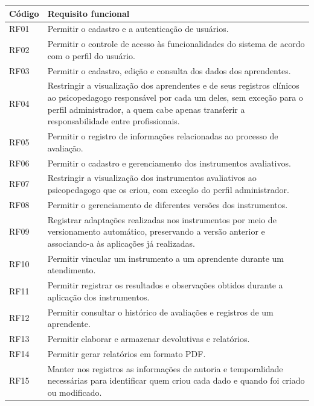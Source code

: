 \begin{quadro}[H]
\centering
\small
\caption{Requisitos funcionais}
\begin{tabular}{p{2cm} p{13cm}}
\hline
\textbf{Código} & \textbf{Requisito funcional} \\
\hline
RF01 & Permitir o cadastro e a autenticação de usuários. \\
RF02 & Permitir o controle de acesso às funcionalidades do sistema de acordo com o perfil do usuário. \\
RF03 & Permitir o cadastro, edição e consulta dos dados dos aprendentes. \\
RF04 & Restringir a visualização dos aprendentes e de seus registros clínicos ao psicopedagogo responsável por cada um deles, sem exceção para o perfil administrador, a quem cabe apenas transferir a responsabilidade entre profissionais. \\
RF05 & Permitir o registro de informações relacionadas ao processo de avaliação. \\
RF06 & Permitir o cadastro e gerenciamento dos instrumentos avaliativos. \\
RF07 & Restringir a visualização dos instrumentos avaliativos ao psicopedagogo que os criou, com exceção do perfil administrador. \\
RF08 & Permitir o gerenciamento de diferentes versões dos instrumentos. \\
RF09 & Registrar adaptações realizadas nos instrumentos por meio de versionamento automático, preservando a versão anterior e associando-a às aplicações já realizadas. \\
RF10 & Permitir vincular um instrumento a um aprendente durante um atendimento. \\
RF11 & Permitir registrar os resultados e observações obtidos durante a aplicação dos instrumentos. \\
RF12 & Permitir consultar o histórico de avaliações e registros de um aprendente. \\
RF13 & Permitir elaborar e armazenar devolutivas e relatórios. \\
RF14 & Permitir gerar relatórios em formato PDF. \\
RF15 & Manter nos registros as informações de autoria e temporalidade necessárias para identificar quem criou cada dado e quando foi criado ou modificado. \\
\hline
\end{tabular}
\label{qua:requisitos_funcionais}
\end{quadro}

